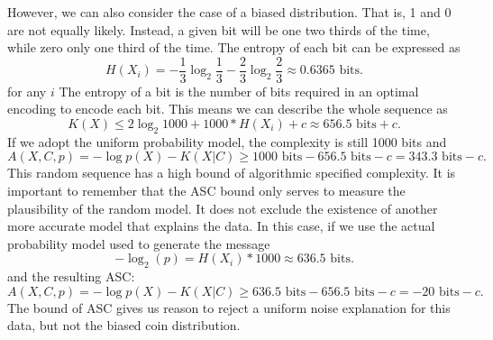 However, we can also consider the case of a biased distribution.
That is, 1 and 0 are not equally likely.
Instead, a given bit will be one two thirds of the time, while zero only one third of the time.
The entropy of each bit can be expressed as
\begin{equation}
    H(X_i) = - \frac{1}{3} \log_2 \frac{1}{3} - \frac{2}{3} \log_2 \frac{2}{3} \approx 0.6365 \mbox{ bits.}
\end{equation} for any $i$
The entropy of a bit is the number of bits required in an optimal encoding to encode each bit.
This means we can describe the whole sequence as
\begin{equation}
    K(X) \leq 2 \log_2 1000 + 1000*H(X_i) + c \approx 656.5 \mbox{ bits} +c \mbox{.}
\end{equation}
If we adopt the uniform probability model, the complexity is still 1000 bits and
\begin{equation}
    A(X,C,p) = - \log p(X) - K(X|C) \geq 1000 \mbox{ bits} - 656.5 \mbox{ bits} - c = 343.3 \mbox{ bits} -c \mbox{.}
\end{equation}
This random sequence has a high bound of algorithmic specified complexity.
It is important to remember that the ASC bound only serves to measure the plausibility of the random model.
It does not exclude the existence of another more accurate model that explains the data.
In this case, if we use the actual probability model used to generate the message
\begin{equation}
    -\log_2(p) = H(X_i) * 1000 \approx 636.5 \mbox{ bits.}
\end{equation}
and the resulting ASC:
\begin{equation}
    A(X,C,p) = - \log p(X) - K(X|C) \geq 636.5 \mbox{ bits} - 656.5 \mbox{ bits} - c = -20 \mbox{ bits} -c \mbox{.}
\end{equation}
The bound of ASC gives us reason to reject a uniform noise explanation for this data, but not the biased coin distribution.

